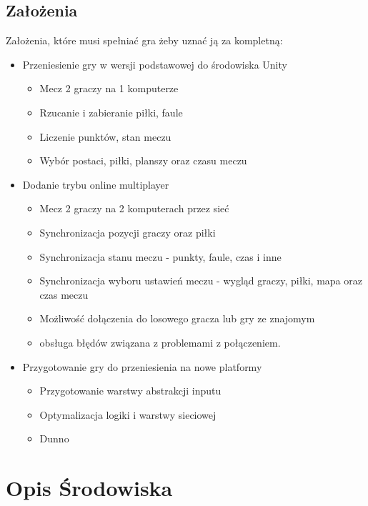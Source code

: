 \documentclass[a4paper,12pt,twoside,openany]{report}
\begin{document}
\section{Założenia}
Założenia, które musi spełniać gra żeby uznać ją za kompletną:

\begin{itemize}
    \item Przeniesienie gry w wersji podstawowej do środowiska Unity
    \begin{itemize}
        \item Mecz 2 graczy na 1 komputerze
        \item Rzucanie i zabieranie piłki, faule
        \item Liczenie punktów, stan meczu
        \item Wybór postaci, piłki, planszy oraz czasu meczu
    \end{itemize}
    
    \item Dodanie trybu online multiplayer
    \begin{itemize}
        \item Mecz 2 graczy na 2 komputerach przez sieć
        \item Synchronizacja pozycji graczy oraz piłki
        \item Synchronizacja stanu meczu - punkty, faule, czas i inne
        \item Synchronizacja wyboru ustawień meczu - wygląd graczy, piłki, mapa oraz czas meczu
        \item Możliwość dołączenia do losowego gracza lub gry ze znajomym
        \item obsługa błędów związana z problemami z połączeniem.
    \end{itemize}
    
    \item Przygotowanie gry do przeniesienia na nowe platformy
    \begin{itemize}
        \item Przygotowanie warstwy abstrakcji inputu
        \item Optymalizacja logiki i warstwy sieciowej
        \item Dunno
    \end{itemize}
\end{itemize}



\chapter{Opis Środowiska}
\end{document}
